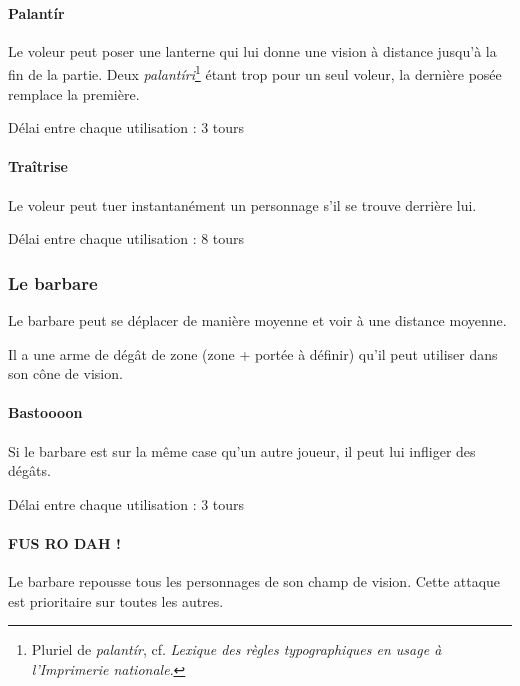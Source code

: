 \paragraph{Palantír} Le voleur peut poser une lanterne qui lui donne une vision à distance jusqu'à la fin de la partie. Deux \emph{palantíri}\footnote{Pluriel de \emph{palantír}, cf. \emph{Lexique des règles typographiques en usage à l’Imprimerie nationale}.} étant trop pour un seul voleur, la dernière posée remplace la première.

    Délai entre chaque utilisation : 3 tours

\paragraph{Traîtrise} Le voleur peut tuer instantanément un personnage s'il se trouve derrière lui.

    Délai entre chaque utilisation : 8 tours

\subsubsection{Le barbare}


Le barbare peut se déplacer de manière moyenne et voir à une distance moyenne.

Il a une arme de dégât de zone (zone + portée à définir) qu’il peut utiliser dans son cône de vision.

\paragraph{Bastoooon} Si le barbare est sur la même case qu’un autre joueur, il peut lui infliger des dégâts.

    Délai entre chaque utilisation : 3 tours

\paragraph{FUS RO DAH !} Le barbare repousse tous les personnages de son champ de vision. Cette attaque est prioritaire sur toutes les autres.

